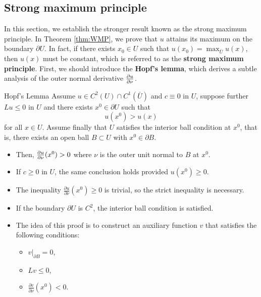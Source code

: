 \subsection{Strong maximum principle}
In this section, we establish the stronger result known as the strong maximum principle. In Theorem \ref{thm:WMP}, we prove that $u$ attains its maximum on the boundary $\partial U$. In fact, if there exists $x_0 \in U$ such that $u(x_0) = \max_{\bar{U}} u(x)$, then $u(x)$ must be constant, which is referred to as the \textbf{strong maximum principle}. First, we should introduce the \textbf{Hopf's lemma}, which derives a subtle analysis of the outer normal derivative $\frac{\partial u}{\partial \nu}$.
\begin{lemma}{Hopf's Lemma}
    \label{lem:Hopf}
    Assume $u\in C^{2}(U)\cap C^{1}(\bar{U})$ and $c\equiv 0$ in $U$, suppose further $Lu\le 0$ in $U$ and there exists $x^{0}\in\partial U$ such that 
    \begin{equation}
        u(x^{0})>u(x)
    \end{equation}
    for all $x\in U$. Assume finally that $U$ satisfies the interior ball condition at $x^{0}$, that is, there exists an open ball $B\subset U$ with $x^{0}\in\partial B$.
    \begin{itemize}
        \item Then, $\frac{\partial u}{\partial \nu}(x^{0})>0$ where $\nu$ is the outer unit normal to $B$ at $x^{0}$.
        \item If $c\ge 0$ in $U$, the same conclusion holds provided $u(x^{0})\ge 0$.
    \end{itemize} 
\end{lemma}
\begin{remark}  
    \begin{itemize}  
      \item The inequality $\frac{\partial u}{\partial \nu}(x^{0})\geq 0$ is trivial, so the strict inequality is necessary.  
      \item If the boundary $\partial U$ is $C^{2}$, the interior ball condition is satisfied.  
      \item The idea of this proof is to construct an auxiliary function $v$ that satisfies the following conditions:  
        \begin{itemize}  
          \item $v|_{\partial B}=0$,  
          \item $Lv\leq 0$,  
          \item $\frac{\partial v}{\partial \nu}(x^{0})<0$.  
        \end{itemize}  
    \end{itemize}  
\end{remark}  
